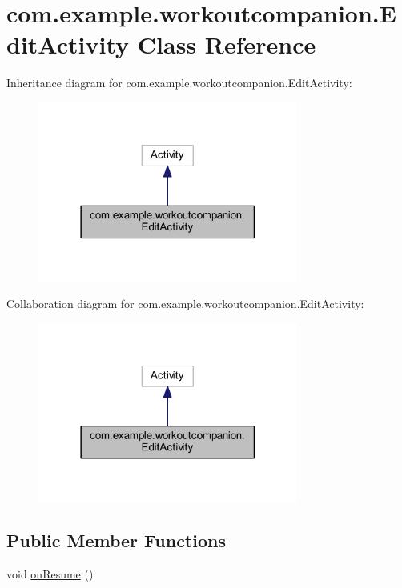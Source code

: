 \hypertarget{classcom_1_1example_1_1workoutcompanion_1_1_edit_activity}{\section{com.\-example.\-workoutcompanion.\-Edit\-Activity Class Reference}
\label{classcom_1_1example_1_1workoutcompanion_1_1_edit_activity}
}


Inheritance diagram for com.\-example.\-workoutcompanion.\-Edit\-Activity\-:
\nopagebreak
\begin{figure}[H]
\begin{center}
\leavevmode
\includegraphics[width=242pt]{classcom_1_1example_1_1workoutcompanion_1_1_edit_activity__inherit__graph}
\end{center}
\end{figure}


Collaboration diagram for com.\-example.\-workoutcompanion.\-Edit\-Activity\-:
\nopagebreak
\begin{figure}[H]
\begin{center}
\leavevmode
\includegraphics[width=242pt]{classcom_1_1example_1_1workoutcompanion_1_1_edit_activity__coll__graph}
\end{center}
\end{figure}
\subsection*{Public Member Functions}
\begin{DoxyCompactItemize}
\item 
void \hyperlink{classcom_1_1example_1_1workoutcompanion_1_1_edit_activity_a6f819a284836a38eca790fe8d2d158ad}{on\-Resume} ()
\end{DoxyCompactItemize}
